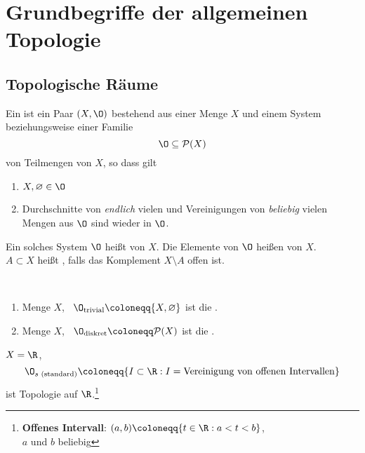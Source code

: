 \chapter{Grundbegriffe der allgemeinen Topologie}

\section{Topologische Räume}

\begin{definition}\label{def:topologie}
  Ein  ist ein Paar \( (X, \O) \) bestehend aus einer Menge \( X \) und einem System beziehungsweise einer Familie 
  \begin{equation*}
    \O \subseteq \mathcal{P}(X)
  \end{equation*}
  von Teilmengen von \( X \), so dass gilt
  \begin{enumerate}
    \item \( X, \varnothing \in \O \) 
    \item Durchschnitte von \emph{endlich} vielen und Vereinigungen von \emph{beliebig} vielen Mengen aus \( \O \) sind wieder in \( \O \).
  \end{enumerate}
  Ein solches System \( \O \) heißt  von \( X \). Die Elemente von \( \O \) heißen  von \( X \). \\
  \( A \subset X \) heißt , falls das Komplement \( X \setminus A \) offen ist.
\end{definition}

\begin{example}[Extrembeispiele]
  \
  \begin{enumerate}
    \item Menge \( X \), \  \( \O_\text{trivial} \coloneqq \{ X, \varnothing \} \) ist die \label{bsp:trivialeTopologie}.
    \item Menge \( X \), \  \( \O_\text{diskret} \coloneqq \mathcal{P}(X) \) ist die \term{diskrete Topologie}\label{bsp:diskreteTopologie}.
  \end{enumerate}
\end{example}

\begin{example}\label{bsp:standardtopologie}
  \( X = \R \),
  \begin{equation*}
    \O_{s \text{ (standard)}} \coloneqq \{ I \subset \R : I = \text{Vereinigung von offenen Intervallen} \}
  \end{equation*}
  ist Topologie auf \( \R \).\footnote{\textbf{Offenes Intervall}: \( (a,b) \coloneqq \{  t \in \R : a < t < b \} \), \\ \( a \) und \( b \) beliebig}
\end{example}


